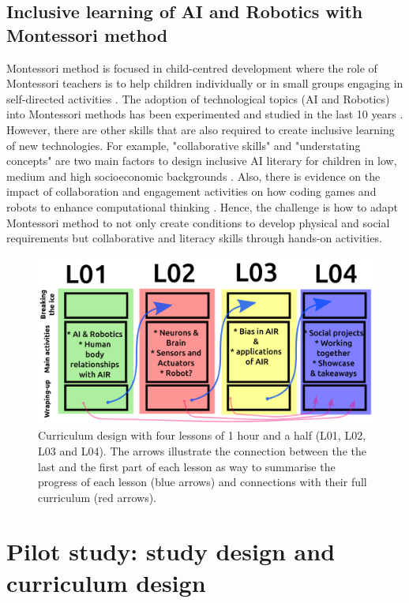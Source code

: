 \documentclass[sigconf]{acmart}
\begin{document}
\subsection{Inclusive learning of AI and Robotics with Montessori method}
Montessori method is focused in child-centred development where the role of Montessori teachers is to help children individually or in small groups engaging in self-directed activities \cite{Aljabreen2020}.
The adoption of technological topics (AI and Robotics) into Montessori methods has been experimented and studied in the last 10 years \cite{elkin2014}. 
However, there are other skills that are also required to create inclusive learning of new technologies. For example, "collaborative skills" and "understating concepts" are two main factors to design inclusive AI literary for children in low, medium and high socioeconomic backgrounds \cite{druga2019}. 
Also, there is evidence on the impact of collaboration and engagement activities on how coding games and robots to enhance computational thinking \cite{sharma2019}.
Hence, the challenge is how to adapt Montessori method to not only create conditions to develop physical and social requirements but collaborative and literacy skills through hands-on activities. 

\begin{figure}[t]
  \centering
    \includegraphics[width=\linewidth]{fig-curriculum.png}  %
    \caption{
    Curriculum design with four lessons of 1 hour and a half (L01, L02, L03 and L04).
    The arrows illustrate the connection between the the last and the first part of each lesson as way to summarise the progress of each lesson (blue arrows) and connections with their full curriculum (red arrows).
    }
    \label{fig:curriculum}
\end{figure}
\section{Pilot study: study design and curriculum design}
\end{document}
